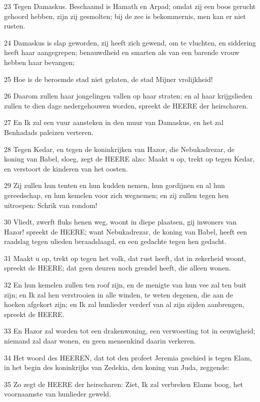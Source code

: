 \par 23 Tegen Damaskus. Beschaamd is Hamath en Arpad; omdat zij een boos gerucht gehoord hebben, zijn zij gesmolten; bij de zee is bekommernis, men kan er niet rusten.
\par 24 Damaskus is slap geworden, zij heeft zich gewend, om te vluchten, en siddering heeft haar aangegrepen; benauwdheid en smarten als van een barende vrouw hebben haar bevangen;
\par 25 Hoe is de beroemde stad niet gelaten, de stad Mijner vrolijkheid!
\par 26 Daarom zullen haar jongelingen vallen op haar straten; en al haar krijgslieden zullen te dien dage nedergehouwen worden, spreekt de HEERE der heirscharen.
\par 27 En Ik zal een vuur aansteken in den muur van Damaskus, en het zal Benhadads paleizen verteren.
\par 28 Tegen Kedar, en tegen de koninkrijken van Hazor, die Nebukadrezar, de koning van Babel, sloeg, zegt de HEERE alzo: Maakt u op, trekt op tegen Kedar, en verstoort de kinderen van het oosten.
\par 29 Zij zullen hun tenten en hun kudden nemen, hun gordijnen en al hun gereedschap, en hun kemelen voor zich wegnemen; en zij zullen tegen hen uitroepen: Schrik van rondom!
\par 30 Vliedt, zwerft fluks henen weg, woont in diepe plaatsen, gij inwoners van Hazor! spreekt de HEERE; want Nebukadrezar, de koning van Babel, heeft een raadslag tegen ulieden beraadslaagd, en een gedachte tegen hen gedacht.
\par 31 Maakt u op, trekt op tegen het volk, dat rust heeft, dat in zekerheid woont, spreekt de HEERE; dat geen deuren noch grendel heeft, die alleen wonen.
\par 32 En hun kemelen zullen ten roof zijn, en de menigte van hun vee zal ten buit zijn; en Ik zal hen verstrooien in alle winden, te weten degenen, die aan de hoeken afgekort zijn; en Ik zal hunlieder verderf van al zijn zijden aanbrengen, spreekt de HEERE.
\par 33 En Hazor zal worden tot een drakenwoning, een verwoesting tot in eeuwigheid; niemand zal daar wonen, en geen mensenkind daarin verkeren.
\par 34 Het woord des HEEREN, dat tot den profeet Jeremia geschied is tegen Elam, in het begin des koninkrijks van Zedekia, den koning van Juda, zeggende:
\par 35 Zo zegt de HEERE der heirscharen: Ziet, Ik zal verbreken Elams boog, het voornaamste van hunlieder geweld.
